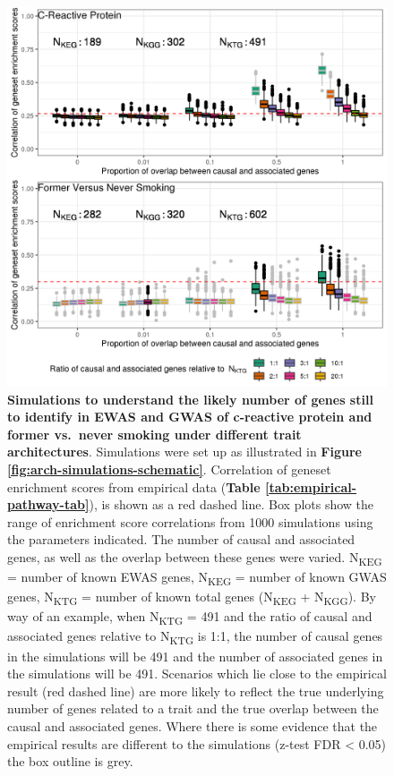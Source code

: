 \documentclass[11pt,oneside]{bristolthesis}
\begin{document}
\begin{figure}

{\centering \includegraphics[width=1\linewidth]{figure/06-ewas_gwas_comparison/architecture_sims_crp_fvns_only_correlation_of_pathway_enrichment_scores} 

}

\caption[Simulations to understand the likely number of genes still to identify in EWAS and GWAS of c-reactive protein and smoking (former vs.~never smokers) under different trait architectures]{\textbf{Simulations to understand the likely number of genes still to identify in EWAS and GWAS of c-reactive protein and former vs.~never smoking under different trait architectures}. Simulations were set up as illustrated in \textbf{Figure \ref{fig:arch-simulations-schematic}}. Correlation of geneset enrichment scores from empirical data (\textbf{Table \ref{tab:empirical-pathway-tab}}), is shown as a red dashed line. Box plots show the range of enrichment score correlations from 1000 simulations using the parameters indicated. The number of causal and associated genes, as well as the overlap between these genes were varied. N\textsubscript{KEG} = number of known EWAS genes, N\textsubscript{KEG} = number of known GWAS genes, N\textsubscript{KTG} = number of known total genes (N\textsubscript{KEG} + N\textsubscript{KGG}). By way of an example, when N\textsubscript{KTG} = 491 and the ratio of causal and associated genes relative to N\textsubscript{KTG} is 1:1, the number of causal genes in the simulations will be 491 and the number of associated genes in the simulations will be 491. Scenarios which lie close to the empirical result (red dashed line) are more likely to reflect the true underlying number of genes related to a trait and the true overlap between the causal and associated genes. Where there is some evidence that the empirical results are different to the simulations (z-test FDR \textless{} 0.05) the box outline is grey.}\label{fig:arch-simulations-crp-fvns}
\end{figure}
\end{document}
